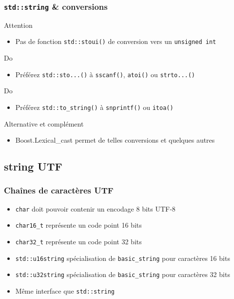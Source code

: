 \documentclass[C++.tex]{subfiles}
\begin{document}
\begin{frame}[fragile]
	\frametitle{\lstinline|std::string| \& conversions}
	\begin{alertblock}{Attention}
		\begin{itemize}
			\item Pas de fonction \lstinline|std::stoui()| de conversion vers un \lstinline|unsigned int|
		\end{itemize}
	\end{alertblock}

	\begin{exampleblock}{Do}
		\begin{itemize}
			\item Préférez \lstinline|std::sto...()| à \lstinline|sscanf()|, \lstinline|atoi()| ou \lstinline|strto...()|
		\end{itemize}
	\end{exampleblock}

	\begin{exampleblock}{Do}
		\begin{itemize}
			\item Préférez \lstinline|std::to_string()| à \lstinline|snprintf()| ou \lstinline|itoa()|
		\end{itemize}
	\end{exampleblock}

	\begin{block}{Alternative et complément}
		\begin{itemize}
			\item Boost.Lexical\_cast permet de telles conversions et quelques autres
		\end{itemize}
	\end{block}
\end{frame}

\subsection*{string UTF}
\begin{frame}[fragile]
	\frametitle{Chaînes de caractères UTF}
	\begin{itemize}
		\item \lstinline|char| doit pouvoir contenir un encodage 8 bits UTF-8


		\item \lstinline|char16_t| représente un code point 16 bits
		\item \lstinline|char32_t| représente un code point 32 bits
		\item \lstinline|std::u16string| spécialisation de \lstinline|basic_string| pour caractères 16 bits
		\item \lstinline|std::u32string| spécialisation de \lstinline|basic_string| pour caractères 32 bits
		\item Même interface que \lstinline|std::string|
	\end{itemize}
\end{frame}
\end{document}
